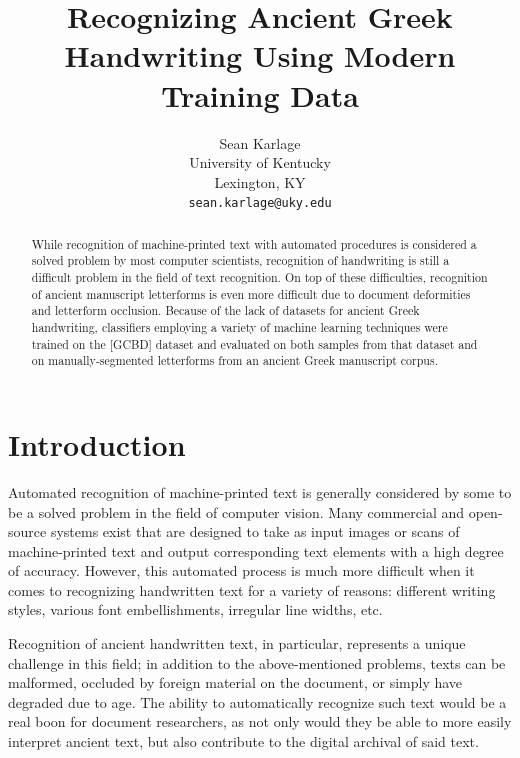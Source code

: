 \documentclass[10pt,twocolumn,letterpaper]{article}
\begin{document}
\title{Recognizing Ancient Greek Handwriting Using Modern Training Data}

\author{Sean Karlage\\
University of Kentucky\\
Lexington, KY\\
{\tt\small sean.karlage@uky.edu}
}

\maketitle

\begin{abstract}
    While recognition of machine-printed text with automated procedures is considered a solved problem by most computer scientists, recognition of handwriting is still a difficult problem in the field of text recognition. On top of these difficulties, recognition of ancient manuscript letterforms is even more difficult due to document deformities and letterform occlusion. Because of the lack of datasets for ancient Greek handwriting, classifiers employing a variety of machine learning techniques were trained on the [GCBD] dataset and evaluated on both samples from that dataset and on manually-segmented letterforms from an ancient Greek manuscript corpus.
\end{abstract}

\section{Introduction}

Automated recognition of machine-printed text is generally considered by some to be a solved problem in the field of computer vision. Many commercial and open-source systems exist that are designed to take as input images or scans of machine-printed text and output corresponding text elements with a high degree of accuracy. However, this automated process is much more difficult when it comes to recognizing handwritten text for a variety of reasons: different writing styles, various font embellishments, irregular line widths, etc.

Recognition of ancient handwritten text, in particular, represents a unique challenge in this field; in addition to the above-mentioned problems, texts can be malformed, occluded by foreign material on the document, or simply have degraded due to age. The ability to automatically recognize such text would be a real boon for document researchers, as not only would they be able to more easily interpret ancient text, but also contribute to the digital archival of said text.
\end{document}

